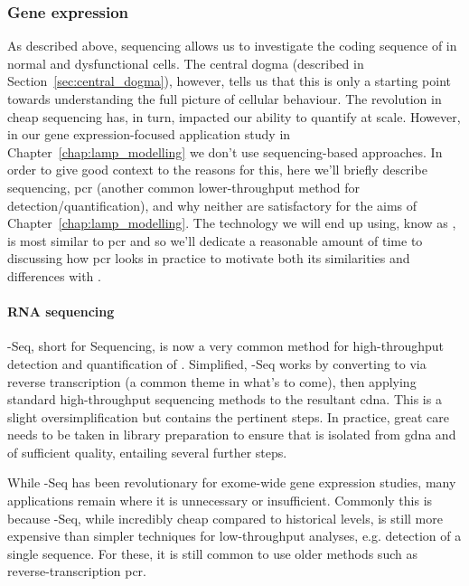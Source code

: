 \documentclass[thesis.tex]{subfiles}
\begin{document}
\subsubsection{Gene expression}
As described above,  sequencing allows us to investigate the coding sequence of  in normal and dysfunctional cells. The central dogma (described in Section~\ref{sec:central_dogma}), however, tells us that this is only a starting point towards understanding the full picture of cellular behaviour. The revolution in cheap  sequencing has, in turn, impacted our ability to quantify  at scale. However, in our gene expression-focused application study in Chapter~\ref{chap:lamp_modelling} we don't use sequencing-based approaches. In order to give good context to the reasons for this, here we'll briefly describe  sequencing, \gls{pcr} (another common lower-throughput method for  detection/quantification), and why neither are satisfactory for the aims of Chapter~\ref{chap:lamp_modelling}. The technology we will end up using, know as , is most similar to \gls{pcr} and so we'll dedicate a reasonable amount of time to discussing how \gls{pcr} looks in practice to motivate both its similarities and differences with .

\paragraph{RNA sequencing}
-Seq, short for  Sequencing, is now a very common method for high-throughput detection and quantification of  \citep{wang_rna-seq_2009}. Simplified, -Seq works by converting  to  via reverse transcription (a common theme in what's to come), then applying standard high-throughput sequencing methods to the resultant \gls{cdna}. This is a slight oversimplification but contains the pertinent steps. In practice, great care needs to be taken in  library preparation to ensure that  is isolated from \gls{gdna} and of sufficient quality, entailing several further steps.

While -Seq has been revolutionary for exome-wide gene expression studies, many applications remain where it is unnecessary or insufficient. Commonly this is because -Seq, while incredibly cheap compared to historical levels, is still more expensive than simpler techniques for low-throughput analyses, e.g. detection of a single  sequence. For these, it is still common to use older methods such as reverse-transcription \gls{pcr}. 
\end{document}
